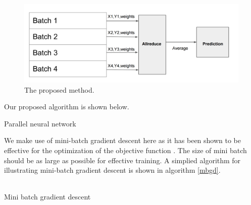 \documentclass{sig-alternate-05-2015}
\begin{document}
\begin{figure}[h]
\centering
\includegraphics[width=\columnwidth]{img/method}
\caption{The proposed method.}
\label{meth}
\end{figure}

Our proposed algorithm is shown below.

\begin{algorithm}[h]
 \caption{Parallel neural network}
\end{algorithm}
We make use of mini-batch gradient descent here as it has been shown to be effective for the optimization of the objective function \cite{seide2011conversational}. The size of mini batch should be as large as possible for effective training.
A simplied algorithm for illustrating mini-batch gradient descent is shown in algorithm \ref{mbgd}.\\ \\
\begin{algorithm}[h]
   \caption{Mini batch gradient descent}
   \label{mbgd}
\end{algorithm}
 
\end{document}
